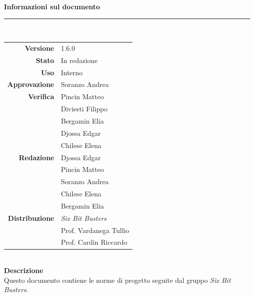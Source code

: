 \begin{titlepage}
\begin{center}
	\large \textbf{Informazioni sul documento} \\
	\rule{0.6\textwidth}{0.4pt}
	\\[0.5cm]
	\begin{tabular}{r|l}
		\textbf{Versione} & 1.6.0\\
		\textbf{Stato} & In redazione\\
		\textbf{Uso} & Interno\\                         
		\textbf{Approvazione} & Soranzo Andrea\\                      
		\textbf{Verifica} & Pincin Matteo\\ & Diviesti Filippo\\ & Bergamin Elia\\ & Djossa Edgar\\ &Chilese Elena \\                     
		\textbf{Redazione} & Djossa Edgar \\ & Pincin Matteo \\ & Soranzo Andrea\\ & Chilese Elena \\ & Bergamin Elia\\
		\textbf{Distribuzione} & \textit{Six Bit Busters} \\ & Prof. Vardanega Tullio \\ & Prof. Cardin Riccardo
	\end{tabular}	
	\\[0.8cm]

	\large \textbf{Descrizione} \\
	Questo documento contiene le norme di progetto seguite dal gruppo \textit{Six Bit Busters}.
	
	
	
	\end{center}
\end{titlepage}
